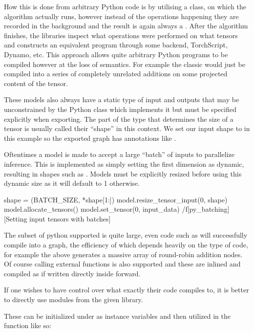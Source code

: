 How this is done from arbitrary Python code is by utilising
a  class,
on which the algorithm actually runs,
however instead of the operations
happening they are recorded in the background
and the result is again always a .
After the algorithm finishes,
the libraries inspect what operations were performed
on what tensors and constructs an equivalent program
through some backend, TorchScript, Dynamo, etc.
This approach allows quite arbitrary Python programs
to be compiled however at the loss of semantics.
For example the classic 
would just be compiled into a series of completely unrelated
additions on some projected content of the tensor.

These models also always have a static type of input and outputs
that may be unconstrained by the Python class which implements it
but must be specified explicitly when exporting.
The part of the type that determines the size of a tensor
is usually called their ``shape'' in this context.
We set our input shape to  in this example
so the exported graph has annotations like .

Oftentimes a model is made to accept a large ``batch'' of inputs
to parallelize inference.
This is implemented as simply
setting the first dimension as dynamic,
resulting in shapes such as .
Models must be explicitly resized before using this dynamic size
as it will default to 1 otherwise.

\midinsert
\begtt {}
shape = (BATCH_SIZE, *shape[1:])
model.resize_tensor_input(0, shape)
model.allocate_tensors()
model.set_tensor(0, input_data)
\endtt
\caplabel/f[py_batching][Setting input tensors with batches]
\endinsert

The subset of python supported is quite large,
even code such as 
will successfully compile into a graph,
the efficiency of which depends heavily on
the type of code,
for example the above generates a massive
array of round-robin addition nodes.
Of course calling external functions is also supported
and these are inlined and compiled as if written
directly inside forward.

If one wishes to have control over what
exactly their code compiles to,
it is better to directly use modules from the given library.

These can be initialized under 
as instance variables and then utilized in
the  function like so:

